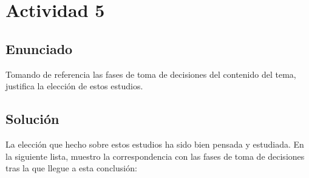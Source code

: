 \section{Actividad 5}

\subsection{Enunciado}
Tomando de referencia las fases de toma de decisiones del contenido del tema, justifica la elección de estos estudios.

\subsection{Solución}
La elección que hecho sobre estos estudios ha sido bien pensada y estudiada. En la siguiente lista, muestro la correspondencia con las fases de toma de decisiones tras la que llegue a esta conclusión:

